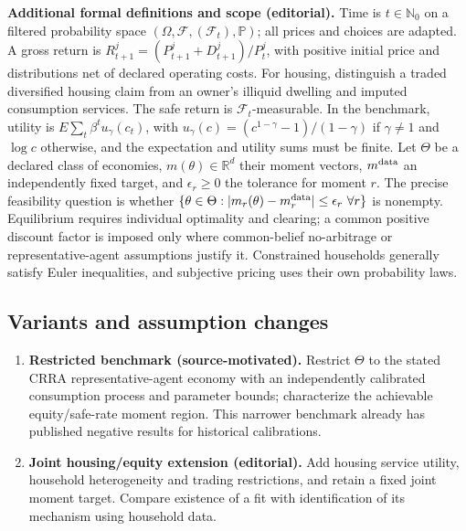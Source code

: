 \documentclass[11pt,a4paper]{article}
\begin{document}
\textbf{Additional formal definitions and scope (editorial).} Time is \(t\in\mathbb N_0\) on a filtered probability space \((\Omega,\mathcal F,(\mathcal F_t),\mathbb P)\); all prices and choices are adapted. A gross return is \(R^j_{t+1}=(P^j_{t+1}+D^j_{t+1})/P^j_t\), with positive initial price and distributions net of declared operating costs. For housing, distinguish a traded diversified housing claim from an owner's illiquid dwelling and imputed consumption services. The safe return is \(\mathcal F_t\)-measurable. In the benchmark, utility is \(E\sum_t\beta^t u_\gamma(c_t)\), with \(u_\gamma(c)=(c^{1-\gamma}-1)/(1-\gamma)\) if \(\gamma\ne1\) and \(\log c\) otherwise, and the expectation and utility sums must be finite. Let \(\Theta\) be a declared class of economies, \(m(\theta)\in\mathbb R^d\) their moment vectors, \(m^{\rm data}\) an independently fixed target, and \(\epsilon_r\geq0\) the tolerance for moment \(r\). The precise feasibility question is whether \(\{\theta\in\Theta:|m_r(\theta)-m_r^{\rm data}|\leq\epsilon_r\ \forall r\}\) is nonempty. Equilibrium requires individual optimality and clearing; a common positive discount factor is imposed only where common-belief no-arbitrage or representative-agent assumptions justify it. Constrained households generally satisfy Euler inequalities, and subjective pricing uses their own probability laws.
\subsection*{Variants and assumption changes}
\begin{enumerate}
\item \textbf{Restricted benchmark (source-motivated).} Restrict \(\Theta\) to the stated CRRA representative-agent economy with an independently calibrated consumption process and parameter bounds; characterize the achievable equity/safe-rate moment region. This narrower benchmark already has published negative results for historical calibrations.
\item \textbf{Joint housing/equity extension (editorial).} Add housing service utility, household heterogeneity and trading restrictions, and retain a fixed joint moment target. Compare existence of a fit with identification of its mechanism using household data.
\end{enumerate}
\end{document}
